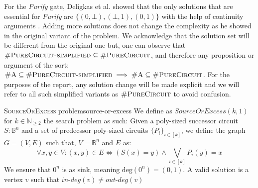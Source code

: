 \begin{table}[h!]
    \centering
 \quad
{}

    \caption{Three-valued logic \cite{kleene_IntroductionMetamathematics_2009}}\label{tab:three-val-logic}
\end{table}




For the \textit{Purify} gate,
Deligkas et al. showed that the only solutions that are essential for \textit{Purify}
are $\{(0,\bot), (\bot,1), (0,1)\}$ with the help of continuity arguments \cite{deligkas_PureCircuitTightInapproximability_2024}.
Adding more solutions does not change the complexity as he showed in the original variant of the problem.
We acknowledge that the solution set will be different from the original one but,
one can observe that  $\textsc{\#PureCircuit-simplified} \subseteq \textsc{\#PureCircuit}$,
and therefore any proposition or argument of the sort:
$\textsc{\#A} \subseteq \textsc{\#PureCircuit-simplified} \implies \textsc{\#A} \subseteq \textsc{\#PureCircuit}$.
For the purposes of the report, any solution change will be made explicit
and we will refer to all such simplified variants as $\textsc{\#PureCircuit}$ to avoid
confusion. 



\begin{definitionbox}{\textsc{SourceOrExcess} problem}{source-or-excess}
    We define as $\textit{SourceOrExcess}(k,1)$ for $k \in \mathbb{N}_{\geq 2}$
    the search problem as such: Given a poly-sized successor circuit $S : \mathbb{B}^n$
    and a set of predecssor poly-sized circuits $\{P_i\}_{i \in [k]}$, we define
    the graph $G = (V,E)$ such that, $V = \mathbb{B}^n$ and $E$ as:
    $$
    \forall x, y \in V: (x,y) \in E \iff (S(x) = y) \wedge \bigvee_{i \in [k]} P_i(y) = x
    $$
    We ensure that $0^n$ is as sink, meaning $\text{deg}(0^n) = (0,1)$.
    A valid solution is a vertex $v$ such that $\textit{in-deg}(v) \neq \textit{out-deg}(v)$
\end{definitionbox}

